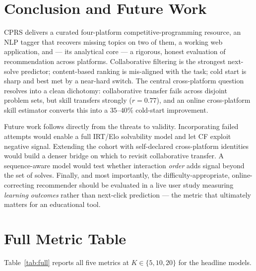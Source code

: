 \documentclass[12pt,a4paper]{article}
\begin{document}
\section[Conclusion and Future Work \textnormal{\small(185 words)}]{Conclusion and Future Work}
\label{sec:conclusion}
CPRS delivers a curated four-platform competitive-programming resource, an NLP tagger
that recovers missing topics on two of them, a working web application, and --- its analytical
core --- a rigorous, honest evaluation of recommendation across platforms. Collaborative
filtering is the strongest next-solve predictor; content-based ranking is mis-aligned
with the task; cold start is sharp and best met by a near-hard switch. The central
cross-platform question resolves into a clean dichotomy: collaborative transfer fails
across disjoint problem sets, but skill transfers strongly ($r=0.77$), and an online
cross-platform skill estimator converts this into a $35$--$40\%$ cold-start improvement.

Future work follows directly from the threats to validity. Incorporating failed attempts
would enable a full IRT/Elo solvability model and let CF exploit negative signal.
Extending the cohort with self-declared cross-platform identities would build a denser
bridge on which to revisit collaborative transfer. A sequence-aware model would test
whether interaction \emph{order} adds signal beyond the set of solves. Finally, and most
importantly, the difficulty-appropriate, online-correcting recommender should be evaluated
in a live user study measuring \emph{learning outcomes} rather than next-click prediction
--- the metric that ultimately matters for an educational tool.

\appendix
\section{Full Metric Table}
\label{app:metrics}
Table~\ref{tab:full} reports all five metrics at $K\in\{5,10,20\}$ for the headline models.
\end{document}
